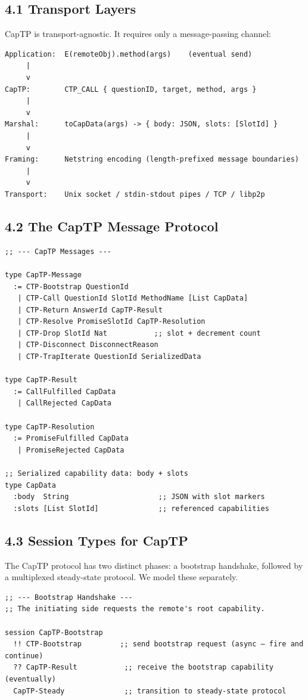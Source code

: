 \documentclass[11pt]{article}
\begin{document}
\subsection{4.1 Transport Layers}
\label{sec:org3882cc3}

CapTP is transport-agnostic. It requires only a message-passing channel:

\begin{verbatim}
Application:  E(remoteObj).method(args)    (eventual send)
     |
     v
CapTP:        CTP_CALL { questionID, target, method, args }
     |
     v
Marshal:      toCapData(args) -> { body: JSON, slots: [SlotId] }
     |
     v
Framing:      Netstring encoding (length-prefixed message boundaries)
     |
     v
Transport:    Unix socket / stdin-stdout pipes / TCP / libp2p
\end{verbatim}
\subsection{4.2 The CapTP Message Protocol}
\label{sec:orgbac0282}

\begin{verbatim}
;; --- CapTP Messages ---

type CapTP-Message
  := CTP-Bootstrap QuestionId
   | CTP-Call QuestionId SlotId MethodName [List CapData]
   | CTP-Return AnswerId CapTP-Result
   | CTP-Resolve PromiseSlotId CapTP-Resolution
   | CTP-Drop SlotId Nat           ;; slot + decrement count
   | CTP-Disconnect DisconnectReason
   | CTP-TrapIterate QuestionId SerializedData

type CapTP-Result
  := CallFulfilled CapData
   | CallRejected CapData

type CapTP-Resolution
  := PromiseFulfilled CapData
   | PromiseRejected CapData

;; Serialized capability data: body + slots
type CapData
  :body  String                     ;; JSON with slot markers
  :slots [List SlotId]              ;; referenced capabilities
\end{verbatim}
\subsection{4.3 Session Types for CapTP}
\label{sec:org4ab97e3}

The CapTP protocol has two distinct phases: a bootstrap handshake, followed
by a multiplexed steady-state protocol. We model these separately.

\begin{verbatim}
;; --- Bootstrap Handshake ---
;; The initiating side requests the remote's root capability.

session CapTP-Bootstrap
  !! CTP-Bootstrap         ;; send bootstrap request (async — fire and continue)
  ?? CapTP-Result           ;; receive the bootstrap capability (eventually)
  CapTP-Steady              ;; transition to steady-state protocol
\end{verbatim}
\end{document}
